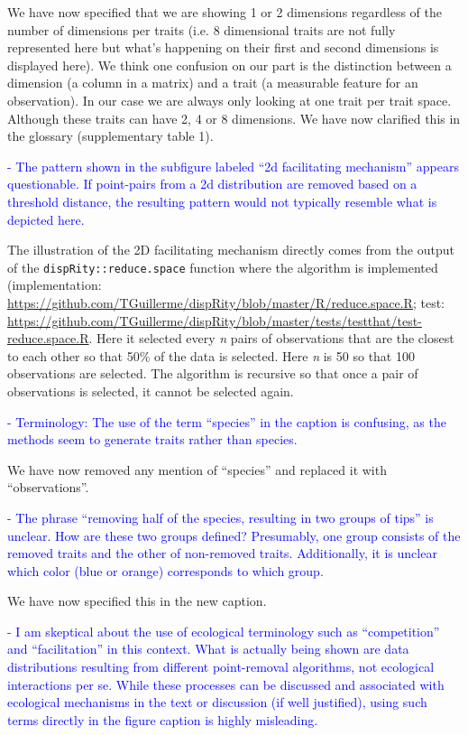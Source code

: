 \documentclass[
]{article}
\begin{document}
We have now specified that we are showing 1 or 2 dimensions regardless of the number of dimensions per traits (i.e. 8 dimensional traits are not fully represented here but what's happening on their first and second dimensions is displayed here).
We think one confusion on our part is the distinction between a dimension (a column in a matrix) and a trait (a measurable feature for an observation).
In our case we are always only looking at one trait per trait space.
Although these traits can have 2, 4 or 8 dimensions.
We have now clarified this in the glossary (supplementary table 1).

\textcolor{blue}{- The pattern shown in the subfigure labeled ``2d facilitating mechanism'' appears questionable.
If point-pairs from a 2d distribution are removed based on a threshold distance, the resulting pattern would not typically resemble what is depicted here.}

The illustration of the 2D facilitating mechanism directly comes from the output of the \texttt{dispRity::reduce.space} function where the algorithm is implemented (implementation: \url{https://github.com/TGuillerme/dispRity/blob/master/R/reduce.space.R}; test: \url{https://github.com/TGuillerme/dispRity/blob/master/tests/testthat/test-reduce.space.R}.
Here it selected every \textit{n} pairs of observations that are the closest to each other so that 50\% of the data is selected.
Here \textit{n} is 50 so that 100 observations are selected.
The algorithm is recursive so that once a pair of observations is selected, it cannot be selected again.

\textcolor{blue}{- Terminology: The use of the term ``species'' in the caption is confusing, as the methods seem to generate traits rather than species.}

We have now removed any mention of ``species'' and replaced it with ``observations''.

\textcolor{blue}{- The phrase ``removing half of the species, resulting in two groups of tips'' is unclear.
How are these two groups defined? Presumably, one group consists of the removed traits and the other of non-removed traits.
Additionally, it is unclear which color (blue or orange) corresponds to which group.}

We have now specified this in the new caption.

\textcolor{blue}{- I am skeptical about the use of ecological terminology such as ``competition'' and ``facilitation'' in this context.
What is actually being shown are data distributions resulting from different point-removal algorithms, not ecological interactions per se.
While these processes can be discussed and associated with ecological mechanisms in the text or discussion (if well justified), using such terms directly in the figure caption is highly misleading.}
\end{document}
